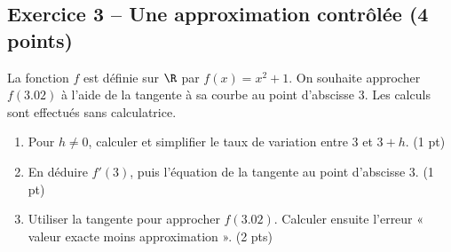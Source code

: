 \subsection*{Exercice 3 -- Une approximation contrôlée (4 points)}
La fonction $f$ est définie sur $\R$ par $f(x)=x^2+1$. On souhaite approcher $f(\num{3,02})$ à l’aide de la tangente à sa courbe au point d’abscisse 3. Les calculs sont effectués sans calculatrice.
\begin{enumerate}
\item Pour $h\ne0$, calculer et simplifier le taux de variation entre 3 et $3+h$. \hfill(1 pt)
\item En déduire $f\prime(3)$, puis l’équation de la tangente au point d’abscisse 3. \hfill(1 pt)
\item Utiliser la tangente pour approcher $f(\num{3,02})$. Calculer ensuite l’erreur « valeur exacte moins approximation ». \hfill(2 pts)
\end{enumerate}
